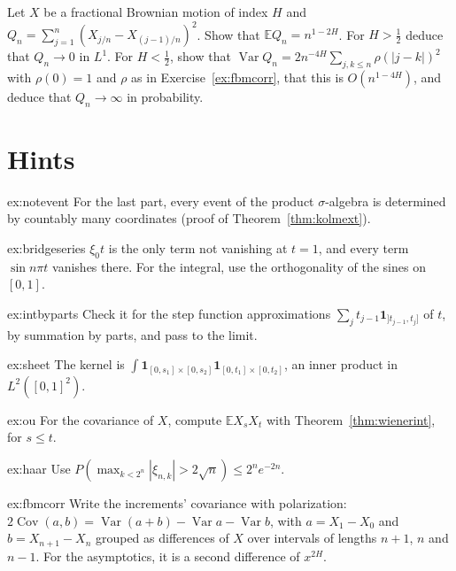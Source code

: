 \begin{exercise}[$\star\star\star$]\label{ex:fbmqv}
Let $X$ be a fractional Brownian motion of index $H$ and $Q_n=\sum_{j=1}^n(X_{j/n}-X_{(j-1)/n})^2$. Show that $\mathbb E Q_n=n^{1-2H}$. For $H>\frac12$ deduce that $Q_n\to0$ in $L^1$. For $H<\frac12$, show that
$\operatorname{Var}Q_n=2n^{-4H}\sum_{j,k\le n}\rho(|j-k|)^2$ with $\rho(0)=1$ and $\rho$ as in Exercise~\ref{ex:fbmcorr}, that this is $O(n^{1-4H})$, and deduce that $Q_n\to\infty$ in probability.
\end{exercise}

\section{Hints}

\begin{hint}{ex:notevent}
For the last part, every event of the product $\sigma$-algebra is determined by countably many coordinates (proof of Theorem~\ref{thm:kolmext}).
\end{hint}

\begin{hint}{ex:bridgeseries}
$\xi_0t$ is the only term not vanishing at $t=1$, and every term $\sin n\pi t$ vanishes there. For the integral, use the orthogonality of the sines on $[0,1]$.
\end{hint}

\begin{hint}{ex:intbyparts}
Check it for the step function approximations $\sum_j t_{j-1}\mathbf 1_{]t_{j-1},t_j]}$ of $t$, by summation by parts, and pass to the limit.
\end{hint}

\begin{hint}{ex:sheet}
The kernel is $\int\mathbf 1_{[0,s_1]\times[0,s_2]}\mathbf 1_{[0,t_1]\times[0,t_2]}$, an inner product in $L^2([0,1]^2)$.
\end{hint}

\begin{hint}{ex:ou}
For the covariance of $X$, compute $\mathbb E X_sX_t$ with Theorem~\ref{thm:wienerint}, for $s\le t$.
\end{hint}

\begin{hint}{ex:haar}
Use $P(\max_{k<2^n}|\xi_{n,k}|>2\sqrt n)\le2^ne^{-2n}$.
\end{hint}

\begin{hint}{ex:fbmcorr}
Write the increments' covariance with polarization: $2\operatorname{Cov}(a,b)=\operatorname{Var}(a+b)-\operatorname{Var}a-\operatorname{Var}b$, with $a=X_1-X_0$ and $b=X_{n+1}-X_n$ grouped as differences of $X$ over
intervals of lengths $n+1$, $n$ and $n-1$. For the asymptotics, it is a second difference of $x^{2H}$.
\end{hint}

